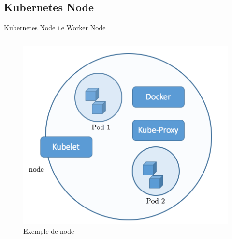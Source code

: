\documentclass{bredelebeamer}
\begin{document}
\subsection{Kubernetes Node}
\begin{frame}{Kubernetes Node i.e Worker Node}
\begin{columns}
\begin{column}{0.3\textwidth}

\begin{figure}
\centering
\includegraphics[scale=0.2]{images/img23.png}
\caption{Exemple de node}
\end{figure}


\end{column}
\end{columns}
\end{frame}
\end{document}

